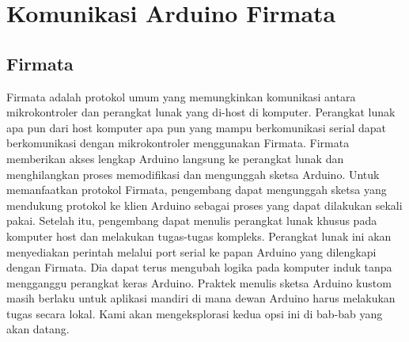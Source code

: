 \section{Komunikasi Arduino Firmata}
\subsection{Firmata}
	Firmata adalah protokol umum yang memungkinkan komunikasi antara mikrokontroler dan perangkat lunak yang di-host di komputer. 
	Perangkat lunak apa pun dari host komputer apa pun yang mampu berkomunikasi serial dapat berkomunikasi dengan mikrokontroler menggunakan Firmata. 
	Firmata memberikan akses lengkap Arduino langsung ke perangkat lunak dan menghilangkan proses memodifikasi dan mengunggah sketsa Arduino. 
	Untuk memanfaatkan protokol Firmata, pengembang dapat mengunggah sketsa yang mendukung protokol ke klien Arduino sebagai proses yang dapat dilakukan sekali pakai. 
	Setelah itu, pengembang dapat menulis perangkat lunak khusus pada komputer host dan melakukan tugas-tugas kompleks. Perangkat lunak ini akan menyediakan perintah melalui port serial ke papan Arduino yang dilengkapi dengan Firmata. Dia dapat terus mengubah logika pada komputer induk tanpa mengganggu perangkat keras Arduino. 
	Praktek menulis sketsa Arduino kustom masih berlaku untuk aplikasi mandiri di mana dewan Arduino harus melakukan tugas secara lokal. Kami akan mengeksplorasi kedua opsi ini di bab-bab yang akan datang.
